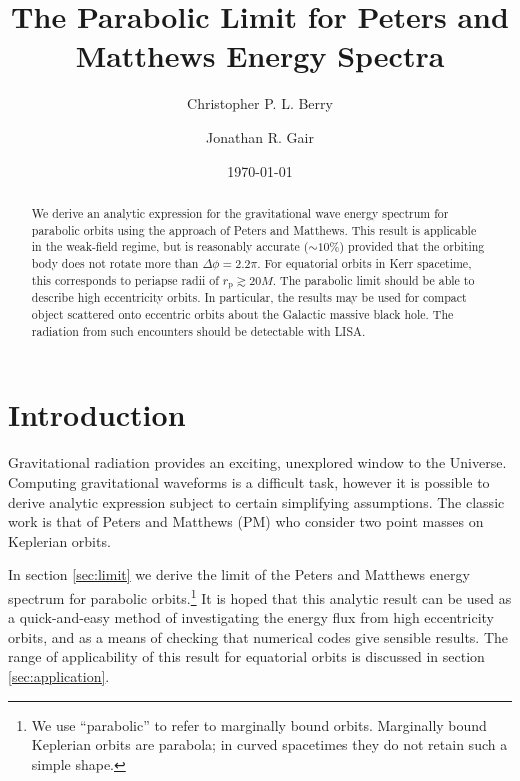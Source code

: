 \documentclass[aps,prd,amsfonts,amssymb,amsmath,reprint,showpacs,groupedaddress]{revtex4-1}
\newcommand{\secref}[1]{section \ref{sec:#1}}
\newcommand{\sub}[1]{\ensuremath{_\text{#1}}}
\begin{document}

\title{The Parabolic Limit for Peters and Matthews Energy Spectra}

\author{Christopher P. L. Berry}
\author{Jonathan R. Gair}

\date{\today}

\begin{abstract}
We derive an analytic expression for the gravitational wave energy spectrum for parabolic orbits using the approach of Peters and Matthews. This result is applicable in the weak-field regime, but is reasonably accurate ($\sim 10\%$) provided that the orbiting body does not rotate more than $\Delta \phi = 2.2\pi$. For equatorial orbits in Kerr spacetime, this corresponds to periapse radii of $r\sub{p} \gtrsim 20 M$. The parabolic limit should be able to describe high eccentricity orbits. In particular, the results may be used for compact object scattered onto eccentric orbits about the Galactic massive black hole. The radiation from such encounters should be detectable with LISA.
\end{abstract}


\maketitle

\section{Introduction}

Gravitational radiation provides an exciting, unexplored window to the Universe. Computing gravitational waveforms is a difficult task, however it is possible to derive analytic expression subject to certain simplifying assumptions. The classic work is that of Peters and Matthews\cite{Peters1963, Peters1964} (PM) who consider two point masses on Keplerian orbits.

In \secref{limit} we derive the limit of the Peters and Matthews energy spectrum for parabolic orbits.\footnote{We use ``parabolic'' to refer to marginally bound orbits. Marginally bound Keplerian orbits are parabola; in curved spacetimes they do not retain such a simple shape.} It is hoped that this analytic result can be used as a quick-and-easy method of investigating the energy flux from high eccentricity orbits, and as a means of checking that numerical codes give sensible results. The range of applicability of this result for equatorial orbits is discussed in \secref{application}.
\end{document}
